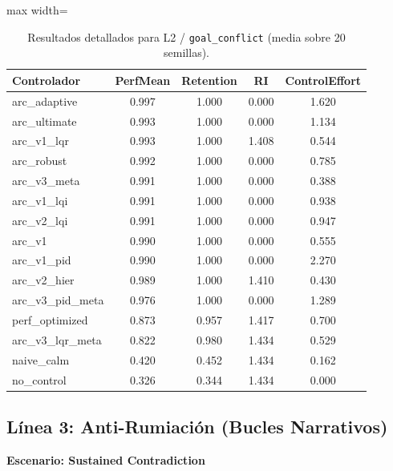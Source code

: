 \documentclass{article}
\newcommand{\scenarioheader}[1]{\Needspace{20\baselineskip}\textbf{Escenario: #1}}
\begin{document}
\begin{table}[H]
\centering
\footnotesize
\caption{Resultados detallados para L2 / \texttt{goal\_conflict} (media sobre 20 semillas).}
\label{tab:g5_goal_conflict}
\begin{adjustbox}{max width=\textwidth}
\begin{tabular}{@{}lcccc@{}}
\toprule
Controlador & PerfMean & Retention & RI & ControlEffort \\ \midrule
arc\_adaptive & 0.997 & 1.000 & 0.000 & 1.620 \\
arc\_ultimate & 0.993 & 1.000 & 0.000 & 1.134 \\
arc\_v1\_lqr & 0.993 & 1.000 & 1.408 & 0.544 \\
arc\_robust & 0.992 & 1.000 & 0.000 & 0.785 \\
arc\_v3\_meta & 0.991 & 1.000 & 0.000 & 0.388 \\
arc\_v1\_lqi & 0.991 & 1.000 & 0.000 & 0.938 \\
arc\_v2\_lqi & 0.991 & 1.000 & 0.000 & 0.947 \\
arc\_v1 & 0.990 & 1.000 & 0.000 & 0.555 \\
arc\_v1\_pid & 0.990 & 1.000 & 0.000 & 2.270 \\
arc\_v2\_hier & 0.989 & 1.000 & 1.410 & 0.430 \\
arc\_v3\_pid\_meta & 0.976 & 1.000 & 0.000 & 1.289 \\
perf\_optimized & 0.873 & 0.957 & 1.417 & 0.700 \\
arc\_v3\_lqr\_meta & 0.822 & 0.980 & 1.434 & 0.529 \\
naive\_calm & 0.420 & 0.452 & 1.434 & 0.162 \\
no\_control & 0.326 & 0.344 & 1.434 & 0.000 \\ \bottomrule
\end{tabular}
\end{adjustbox}
\end{table}

\FloatBarrier
\subsection{Línea 3: Anti-Rumiación (Bucles Narrativos)}

\scenarioheader{Sustained Contradiction}
\end{document}
